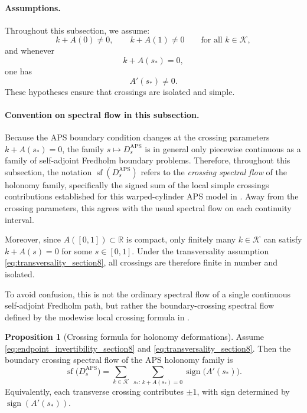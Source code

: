 \documentclass[11pt]{article}
\theoremstyle{definition}
\newtheorem{proposition}[theorem]{Proposition}
\DeclareMathOperator{\APS}{APS}
\numberwithin{equation}{section}
\begin{document}
\paragraph{Assumptions.}
Throughout this subsection, we assume:
\begin{equation}\label{eq:endpoint_invertibility_section8}
k+A(0)\neq 0,
\qquad
k+A(1)\neq 0
\qquad
\text{for all }k\in\mathcal K,
\end{equation}
and whenever
\begin{equation}\label{eq:wall_hit_section8}
k+A(s_*)=0,
\end{equation}
one has
\begin{equation}\label{eq:transversality_section8}
 A'(s_*)\neq 0.
\end{equation}
These hypotheses ensure that crossings are isolated and simple.

\paragraph{Convention on spectral flow in this subsection.}
Because the APS boundary condition changes at the crossing parameters \(k+A(s_*)=0\), the family \(s\mapsto D_s^{\APS}\) is in general only piecewise continuous as a family of self-adjoint Fredholm boundary problems. Therefore, throughout this subsection, the notation \(\operatorname{sf}(D_s^{\APS})\) refers to the \emph{crossing spectral flow} of the holonomy family, specifically the signed sum of the local simple crossings contributions established for this warped-cylinder APS model in \cite{KS}.
Away from the crossing parameters, this agrees with the usual spectral flow on each
continuity interval.

Moreover, since \(A([0,1])\subset\mathbb R\) is compact, only finitely many \(k\in\mathcal K\) can satisfy \(k+A(s)=0\) for some
\(s\in[0,1]\). Under the transversality assumption
\eqref{eq:transversality_section8}, all crossings are therefore finite in number and isolated.

To avoid confusion, this is not the ordinary spectral flow of a single continuous self-adjoint Fredholm path, but rather the boundary-crossing spectral flow defined by the modewise local crossing formula in \cite{KS}.


\begin{proposition}[Crossing formula for holonomy deformations]
\label{prop:wallcross}
Assume \eqref{eq:endpoint_invertibility_section8} and
\eqref{eq:transversality_section8}. Then the boundary crossing spectral flow of the APS holonomy family is
\begin{equation}\label{eq:integer_wallcross}
\operatorname{sf}\bigl(D_s^{\APS}\bigr)
=
\sum_{k\in\mathcal K}\ \sum_{s_*:\,k+A(s_*)=0}
\operatorname{sign}\bigl( A'(s_*)\bigr).
\end{equation}
Equivalently, each transverse crossing contributes \(\pm1\), with sign
determined by \(\operatorname{sign}(A'(s_*))\).
\end{proposition}
\end{document}
